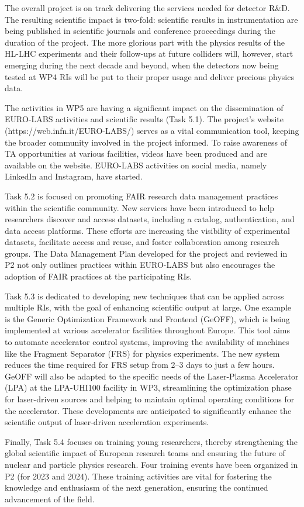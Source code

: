 The overall project is on track delivering the services needed for detector R\&D. The resulting scientific impact is two-fold: scientific results in instrumentation are being published in scientific journals and conference proceedings during the duration of the project. The more glorious part with the physics results of the HL-LHC experiments and their follow-ups at future colliders will, however, start emerging during the next decade and beyond, when the detectors now being tested at WP4 RIs will be put to their proper usage and deliver precious physics data.

The activities in WP5 are having a significant impact on the dissemination of EURO-LABS activities and scientific results (Task 5.1). The project’s website (https://web.infn.it/EURO-LABS/) serves as a vital communication tool, keeping the broader community involved in the project informed. To raise awareness of TA opportunities at various facilities, videos have been produced and are available on the website. EURO-LABS activities on social media, namely LinkedIn and Instagram, have started.  

Task 5.2 is focused on promoting FAIR research data management practices within the scientific community. New services have been introduced to help researchers discover and access datasets, including a catalog, authentication, and data access platforms. These efforts are increasing the visibility of experimental datasets, facilitate access and reuse, and foster collaboration among research groups. The Data Management Plan developed for the project and reviewed in P2 not only outlines practices within EURO-LABS but also encourages the adoption of FAIR practices at the participating RIs.

Task 5.3 is dedicated to developing new techniques that can be applied across multiple RIs, with the goal of enhancing scientific output at large. One example is the Generic Optimization Framework and Frontend (GeOFF), which is being implemented at various accelerator facilities throughout Europe. This tool aims to automate accelerator control systems, improving the availability of machines like the Fragment Separator (FRS) for physics experiments. The new system reduces the time required for FRS setup from 2–3 days to just a few hours. GeOFF will also be adapted to the specific needs of the Laser-Plasma Accelerator (LPA) at the LPA-UHI100 facility in WP3, streamlining the optimization phase for laser-driven sources and helping to maintain optimal operating conditions for the accelerator. These developments are anticipated to significantly enhance the scientific output of laser-driven acceleration experiments.

Finally, Task 5.4 focuses on training young researchers, thereby strengthening the global scientific impact of European research teams and ensuring the future of nuclear and particle physics research. 
Four training events have been organized in P2 (for 2023 and 2024). These training activities are vital for fostering the knowledge and enthusiasm of the next generation, ensuring the continued advancement of the field.

